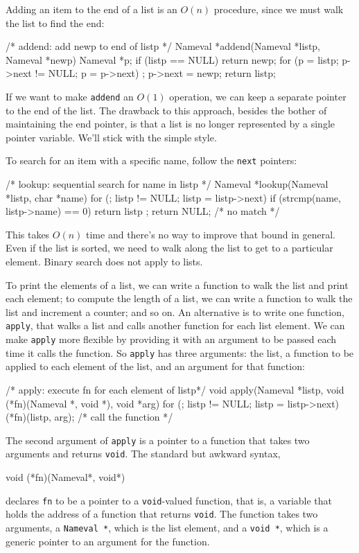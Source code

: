 Adding an item to the end of a list is an $O(n)$ procedure, since we must
walk the list to find the end:
\begin{wellcode}
    /* addend: add newp to end of listp */
    Nameval *addend(Nameval *listp, Nameval *newp)
    {
        Nameval *p;
        if (listp == NULL)
            return newp;
        for (p = listp; p->next != NULL; p = p->next)
            ;
        p->next = newp;
        return listp;
    }
\end{wellcode}
If we want to make \verb'addend' an $O(1)$ operation, we can keep a
separate pointer to the end of the list. The drawback to this approach,
besides the bother of maintaining the end pointer, is that a list is no
longer represented by a single pointer variable. We'll stick with the
simple style.

To search for an item with a specific name, follow the \verb'next'
pointers:
\begin{wellcode}
    /* lookup: sequential search for name in listp */
    Nameval *lookup(Nameval *listp, char *name)
    {
        for (; listp != NULL; listp = listp->next)
            if (strcmp(name, listp->name) == 0)
                return listp ;
        return NULL; /* no match */
    }
\end{wellcode}
This takes $O(n)$ time and there's no way to improve that bound in general.
Even if the list is sorted, we need to walk along the list to get to a
particular element. Binary search does not apply to lists.

To print the elements of a list, we can write a function to walk the list
and print each element; to compute the length of a list, we can write a
function to walk the list and increment a counter; and so on. An
alternative is to write one function, \verb'apply', that walks a list and
calls another function for each list element. We can make \verb'apply' more
flexible by providing it with an argument to be passed each time it calls
the function. So \verb'apply' has three arguments: the list, a function to
be applied to each element of the list, and an argument for that function:
\begin{wellcode}
    /* apply: execute fn for each element of listp*/
    void apply(Nameval *listp,
            void (*fn)(Nameval *, void *), void *arg)
    {
        for (; listp != NULL; listp = listp->next)
            (*fn)(listp, arg);      /* call the function */
    }
\end{wellcode}
The second argument of \verb'apply' is a pointer to a function that takes
two arguments and returns \verb'void'. The standard but awkward syntax,
\begin{wellcode}
    void (*fn)(Nameval*, void*)
\end{wellcode}
declares \verb'fn' to be a pointer to a \verb'void'-valued function, that
is, a variable that holds the address of a function that returns
\verb'void'. The function takes two arguments, a \verb'Nameval *', which is
the list element, and a \verb'void *', which is a generic pointer to an
argument for the function.

